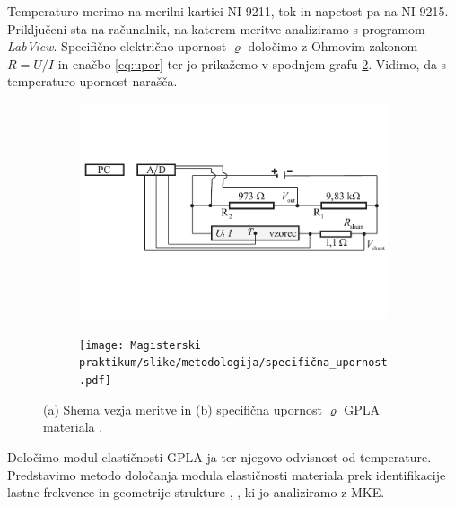             Temperaturo merimo na merilni kartici NI 9211, tok in napetost pa na NI 9215. Priključeni sta na računalnik, na katerem meritve analiziramo s programom \textit{LabView}. Specifično električno upornost $\varrho$ določimo z Ohmovim zakonom $R=U /I$ in enačbo \eqref{eq:upor} ter jo prikažemo v spodnjem grafu \ref{fig:spec_el_upornost}. Vidimo, da s temperaturo upornost narašča.
            \begin{figure}[!htb]
                \centering
                \begin{subfigure}{.489\textwidth}
                    \centering
                    \includegraphics[width=\linewidth]{Magisterski praktikum/slike/metodologija/vezje.pdf}
                    \caption{}
                    \label{fig:merilna_shema_a}
                \end{subfigure}%
                \begin{subfigure}{.489\textwidth}
                    \centering
                    \texttt{[image: Magisterski praktikum/slike/metodologija/specifična\_upornost.pdf]}
                    \caption{}
                    \label{fig:spec_el_upornost}
                \end{subfigure}%
                \caption{(a) Shema vezja meritve in (b) specifična upornost $\varrho$ GPLA materiala \cite{Bizjan_2021}.}
                \label{fig:merilna_shema}
            \end{figure}
            Določimo modul elastičnosti GPLA-ja ter njegovo odvisnost od temperature. Predstavimo metodo določanja modula elastičnosti materiala prek identifikacije lastne frekvence in geometrije strukture \cite{Pintelon_2003}, \cite{Kosir_2021}, ki jo analiziramo z MKE.
